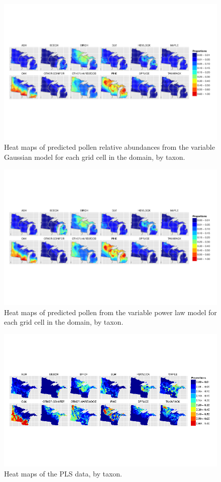 \begin{figure}
\centering
\includegraphics[width=7in]{figures/maps_predicted_pollen_g_flexible.png}
\caption{Heat maps of predicted pollen relative abundances from the
  variable Gaussian model for each grid cell in the domain, by taxon.}
\label{fig:maps_pollen_g}
\end{figure}


\begin{figure}
\centering
\includegraphics[width=7in]{figures/maps_predicted_pollen_pl_flexible.png}
\caption{Heat maps of predicted pollen from the variable power law model for each grid cell in the domain, by taxon.}
\label{fig:maps_pollen_pl}
\end{figure}

\begin{figure}
\centering
\includegraphics[width=7in]{figures/maps_veg.png}
\caption{Heat maps of the PLS data, by taxon.}
\label{fig:maps_veg}
\end{figure}





